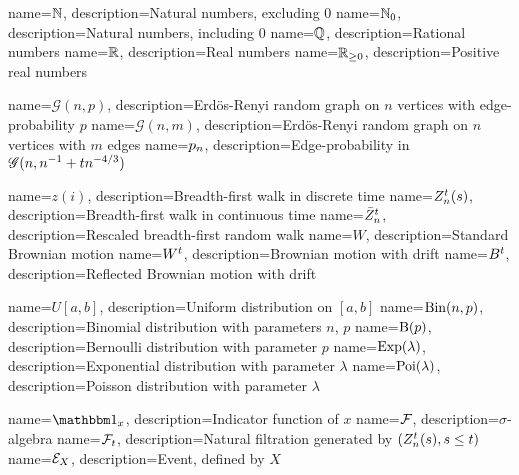 
\usepackage[nopostdot, nonumberlist, toc, style = super]{glossaries}
\makenoidxglossaries 

{
	name={$\mathbb{N}$},
	description={Natural numbers, excluding 0}
}
{
name={$\mathbb{N}_0$},
description={Natural numbers, including 0}
}
{
name={$\mathbb{Q}$},
description={Rational numbers}
}
{
	name={$\mathbb{R}$},
	description={Real numbers}
}
{
name={$\mathbb{R}_{\geq 0}$},
description={Positive real numbers}
}

{
name={$\mathscr{G}(n,p)$},
description={Erd\"os-Renyi random graph on $n$ vertices with edge-probability $p$}
}
{
	name={$\mathscr{G}(n,m)$},
	description={Erdös-Renyi random graph on $n$ vertices with $m$ edges}
}
{
name={$p_n$},
description={Edge-probability in $\mathscr{G}(n, n^{-1} + tn^{-4/3})$}
}

{
name={$z(i)$},
description={Breadth-first walk in discrete time}
}
{
name={$Z_n^t(s)$},
description={Breadth-first walk in continuous time}
}
{
name={$\bar{Z}^t_n$},
description={Rescaled breadth-first random walk}
}
{
name={$W$},
description={Standard Brownian motion}
}
{
name={$W^t$},
description={Brownian motion with drift}
}
{
name={$B^t$},
description={Reflected Brownian motion with drift}
}

{
	name={$U[a,b]$},
	description={Uniform distribution on $[a,b]$}
}
{
name={$\operatorname*{Bin}(n,p)$},
description={Binomial distribution with parameters $n$, $p$}
}
{
name={$\operatorname*{B}(p)$},
description={Bernoulli distribution with parameter $p$}
}
{
name={$\operatorname*{Exp}(\lambda)$},
description={Exponential distribution with parameter $\lambda$}
}
{
name={$\operatorname*{Poi}(\lambda)$},
description={Poisson distribution with parameter $\lambda$}
}

{
name={$\Ind{x}$},
description={Indicator function of $x$}
}
{
name={$\mathcal{F}$},
description={$\sigma$-algebra}
}
{
name={$\mathcal{F}_t$},
description={Natural filtration generated by $(Z_n^t(s), s \leq t)$}
}
{
name={$\mathcal{E}_{X}$},
description={Event, defined by $X$}
}
